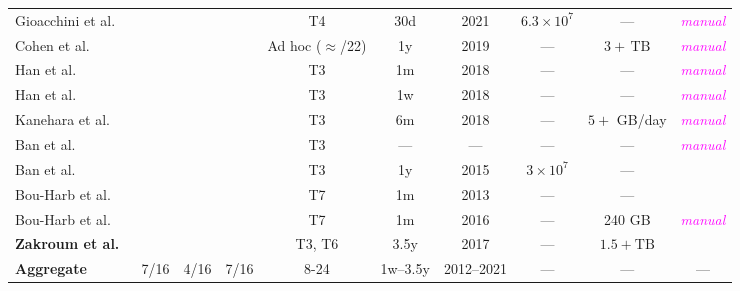 \documentclass[manuscript,nonacm]{acmart}
\newcommand{\cmark}{\ding{51}}%
\newcommand{\xmark}{\ding{55}}%
\newcommand{\wc}[1]{\textit{\textcolor{magenta}{#1}}} %
\begin{document}
\begin{table*}[h!]
\begin{tabular}{@{}l p{4em} c c c c c c c c@{}}
        Gioacchini et al.~\cite{2021gioacchini,2023gioacchini}
        & \cmark~\cite{2020cohen}
        & \cmark & \cmark
        & T4
        & 30d & 2021
        & $6.3\times10^{7}$ & ---
        & \wc{manual} \\

        Cohen et al.~\cite{2020cohen}
        & \cmark~\cite{2016ban}
        & \xmark & \cmark
        & Ad hoc ($\approx$/22)
        & 1y & 2019
        & --- & $3+\,\mathrm{TB}$
        & \wc{manual} \\

        Han et al.~\cite{2021han,2022han}
        & \cmark
        & \cmark & \xmark
        & T3
        & 1m & 2018
        & --- & ---
        & \wc{manual} \\

        Han et al.~\cite{2020han,2022han}
        & \cmark
        & \cmark & \cmark
        & T3
        & 1w & 2018
        & --- & ---
        & \wc{manual} \\

        Kanehara et al.~\cite{2019kanehara,2022han}
        & \cmark
        & \xmark & \cmark
        & T3
        & 6m & 2018
        & --- & $5+$ GB/day
        & \wc{manual} \\

        Ban et al.~\cite{2017ban}
        & \xmark
        & \xmark & \xmark
        & T3
        & --- & ---
        & --- & ---
        & \wc{manual} \\

        Ban et al.~\cite{2016ban}
        & \xmark
        & \xmark & \xmark
        & T3
        & 1y & 2015
        & $3\times10^{7}$ & ---
        & \xmark \\

        Bou-Harb et al.~\cite{2014bouharb}
        & \xmark
        & \xmark & \xmark
        & T7
        & 1m & 2013
        & --- & ---
        & \xmark \\

        Bou-Harb et al.~\cite{2019bouharb,2015bouharb}
        & \cmark
        & \xmark & \cmark
        & T7
        & 1m & 2016
        & --- & 240 GB
        & \wc{manual} \\

        \textbf{Zakroum et al.~\cite{2022zakroum,2018zakroum}}
        & \cmark
        & \xmark & \cmark
        & T3, T6
        & 3.5y & 2017
        & --- & $1.5+\mathrm{TB}$
        & \xmark \\
        \midrule
        \textbf{Aggregate}
        & 7/16
        & 4/16 & 7/16
        & 8-24
        & 1w--3.5y & 2012--2021
        & --- & ---
        & --- \\
        \bottomrule
    \end{tabular}
\end{table*}
\end{document}
